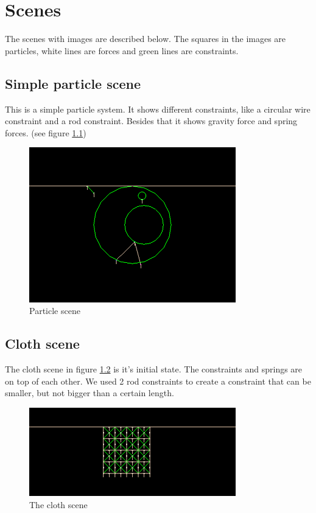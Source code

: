 \chapter{Scenes}
The scenes with images are described below. The squares in the images are particles, white lines are forces and green lines are constraints.

\section{Simple particle scene}
This is a simple particle system. It shows different constraints, like a circular wire constraint and a rod constraint. Besides that it shows gravity force and spring forces. (see figure \ref{fig:Particle})
\begin{figure}[htb!]
    \centering
    \includegraphics[width=0.8\textwidth]{images/Particle}
    \caption{Particle scene}
    \label{fig:Particle}
\end{figure} 

\section{Cloth scene}

The cloth scene in figure \ref{fig:Cloth} is it's initial state. The constraints and springs are on top of each other. We used 2 rod constraints to create a constraint that can be smaller, but not bigger than a certain length.

\begin{figure}[htb!]
    \centering
    \includegraphics[width=0.8\textwidth]{images/Cloth}
    \caption{The cloth scene}
    \label{fig:Cloth}
\end{figure} 


